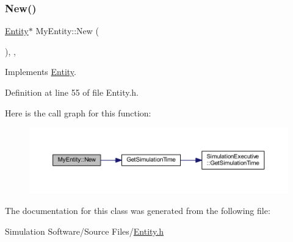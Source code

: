 \subsubsection{\texorpdfstring{New()}{New()}}
{\footnotesize\ttfamily \hyperlink{class_entity}{Entity}$\ast$ My\+Entity\+::\+New (\begin{DoxyParamCaption}{ }\end{DoxyParamCaption})\hspace{0.3cm}{\ttfamily [inline]}, {\ttfamily [override]}, {\ttfamily [virtual]}}



Implements \hyperlink{class_entity_ab8dc894a31d5c72219fa070345d7c383}{Entity}.



Definition at line 55 of file Entity.\+h.

Here is the call graph for this function\+:\nopagebreak
\begin{figure}[H]
\begin{center}
\leavevmode
\includegraphics[width=350pt]{class_my_entity_acc29e753a0df1928eb4c9e627d65a3b3_cgraph}
\end{center}
\end{figure}


The documentation for this class was generated from the following file\+:\begin{DoxyCompactItemize}
\item 
Simulation Software/\+Source Files/\hyperlink{_entity_8h}{Entity.\+h}\end{DoxyCompactItemize}
